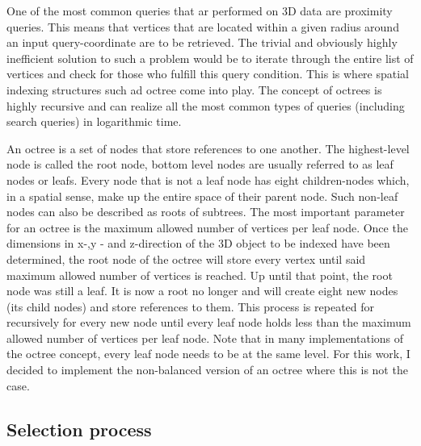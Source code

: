 One of the most common queries that ar performed on 3D data are proximity queries. This means that vertices that are located within a given radius around an input query-coordinate are to be retrieved. The trivial and obviously highly inefficient solution to such a problem would be to iterate through the entire list of vertices and check for those who fulfill this query condition. This is where spatial indexing structures such ad octree come into play. The concept of octrees is highly recursive and can realize all the most common types of queries (including search queries) in logarithmic time.

An octree is a set of nodes that store references to one another. The highest-level node is called the root node, bottom level nodes are usually referred to as leaf nodes or leafs. Every node that is not a leaf node has eight children-nodes which, in a spatial sense, make up the entire space of their parent node. Such non-leaf nodes can also be described as roots of subtrees.
The most important parameter for an octree is the maximum allowed number of vertices per leaf node. Once the dimensions in x-,y - and z-direction of the 3D object to be indexed have been determined, the root node of the octree will store every vertex until said maximum allowed number of vertices is reached. Up until that point, the root node was still a leaf. It is now a root no longer and will create eight new nodes (its child nodes) and store references to them. This process is repeated for recursively for every new node until every leaf node holds less than the maximum allowed number of vertices per leaf node. Note that in many implementations of the octree concept, every leaf node needs to be at the same level. For this work, I decided to implement the non-balanced version of an octree where this is not the case.

		\subsection{Selection process}
		\label{sec:selection_process}
